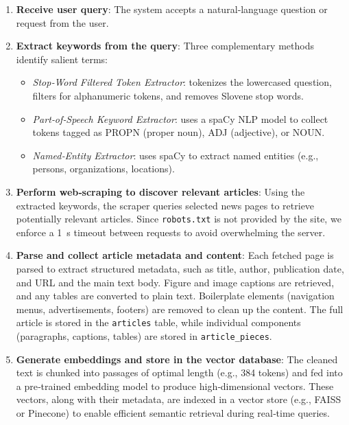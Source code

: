 \documentclass[fleqn,moreauthors,10pt]{ds_report}
\begin{document}
\begin{enumerate}
  \item \textbf{Receive user query}:  
    The system accepts a natural‑language question or request from the user.
  \item \textbf{Extract keywords from the query}:  
    Three complementary methods identify salient terms:
    \begin{itemize}
      \item \emph{Stop‑Word Filtered Token Extractor}: tokenizes the lowercased question, filters for alphanumeric tokens, and removes Slovene stop words.
      \item \emph{Part‑of‑Speech Keyword Extractor}: uses a spaCy NLP model to collect tokens tagged as PROPN (proper noun), ADJ (adjective), or NOUN.
      \item \emph{Named‑Entity Extractor}: uses spaCy to extract named entities (e.g., persons, organizations, locations).
    \end{itemize}
  
  \item \textbf{Perform web‑scraping to discover relevant articles}:  
    Using the extracted keywords, the scraper queries selected news pages to retrieve potentially relevant articles. Since \texttt{robots.txt} is not provided by the site, we enforce a 1 s timeout between requests to avoid overwhelming the server.
  
  \item \textbf{Parse and collect article metadata and content}:  
    Each fetched page is parsed to extract structured metadata, such as title, author, publication date, and URL and the main text body. Figure and image captions are retrieved, and any tables are converted to plain text. Boilerplate elements (navigation menus, advertisements, footers) are removed to clean up the content. The full article is stored in the \texttt{articles} table, while individual components (paragraphs, captions, tables) are stored in \texttt{article\_pieces}.
  
  \item \textbf{Generate embeddings and store in the vector database}:  
    The cleaned text is chunked into passages of optimal length (e.g., 384 tokens) and fed into a pre‑trained embedding model to produce high‑dimensional vectors. These vectors, along with their metadata, are indexed in a vector store (e.g., FAISS or Pinecone) to enable efficient semantic retrieval during real‑time queries.
\end{enumerate}
\end{document}
